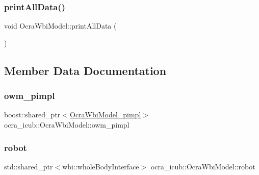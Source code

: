 \hypertarget{classocra__icub_1_1OcraWbiModel_a309b3554c4eefda46c05b766476f40fb}{}\label{classocra__icub_1_1OcraWbiModel_a309b3554c4eefda46c05b766476f40fb} 
\subsubsection{\texorpdfstring{print\+All\+Data()}{printAllData()}}
{\footnotesize\ttfamily void Ocra\+Wbi\+Model\+::print\+All\+Data (\begin{DoxyParamCaption}{ }\end{DoxyParamCaption})}



\subsection{Member Data Documentation}
\hypertarget{classocra__icub_1_1OcraWbiModel_ab649cb769ca4edd345b3c09c43a69bde}{}\label{classocra__icub_1_1OcraWbiModel_ab649cb769ca4edd345b3c09c43a69bde} 
\subsubsection{\texorpdfstring{owm\+\_\+pimpl}{owm\_pimpl}}
{\footnotesize\ttfamily boost\+::shared\+\_\+ptr$<$\hyperlink{structOcraWbiModel_1_1OcraWbiModel__pimpl}{Ocra\+Wbi\+Model\+\_\+pimpl}$>$ ocra\+\_\+icub\+::\+Ocra\+Wbi\+Model\+::owm\+\_\+pimpl\hspace{0.3cm}{\ttfamily [private]}}

\hypertarget{classocra__icub_1_1OcraWbiModel_ae377f000580656227fa9ef69f2f2e71d}{}\label{classocra__icub_1_1OcraWbiModel_ae377f000580656227fa9ef69f2f2e71d} 
\subsubsection{\texorpdfstring{robot}{robot}}
{\footnotesize\ttfamily std\+::shared\+\_\+ptr$<$wbi\+::whole\+Body\+Interface$>$ ocra\+\_\+icub\+::\+Ocra\+Wbi\+Model\+::robot\hspace{0.3cm}{\ttfamily [private]}}

